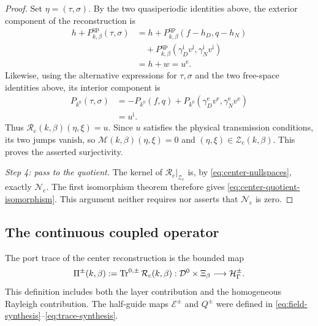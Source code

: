 \begin{proof}
Set $\eta=(\tau,\sigma)$.  By the two quasiperiodic identities above, the
exterior component of the reconstruction is
\begin{align*}
  h+P^{\mathrm{qp}}_{k,\beta}(\tau,\sigma)
  &=h+P^{\mathrm{qp}}_{k,\beta}(f-h_D,q-h_N)\\
  &\quad
    +P^{\mathrm{qp}}_{k,\beta}
      (\gamma_D^{\mathrm i}v^{\mathrm i},
       \gamma_N^{\mathrm i}v^{\mathrm i})\\
  &=h+w=u^{\mathrm e}.
\end{align*}
Likewise, using the alternative expressions for $\tau,\sigma$ and the two
free-space identities above, its interior component is
\begin{align*}
  P_{k^0}(\tau,\sigma)
  &=-P_{k^0}(f,q)
    +P_{k^0}(\gamma_D^{\mathrm e}v^{\mathrm e},
             \gamma_N^{\mathrm e}v^{\mathrm e})\\
  &=u^{\mathrm i}.
\end{align*}
Thus $\mathcal R_{\mathrm c}(k,\beta)(\eta,\xi)=u$.  Since $u$ satisfies
the physical transmission conditions, its two jumps vanish, so
$\mathcal M(k,\beta)(\eta,\xi)=0$ and
$(\eta,\xi)\in\mathcal Z_{\mathrm c}(k,\beta)$.  This proves the asserted
surjectivity.

\emph{Step 4: pass to the quotient.}
The kernel of
$\mathcal R_{\mathrm c}|_{\mathcal Z_{\mathrm c}}$ is, by
\eqref{eq:center-nullspaces}, exactly $\mathcal N_{\mathrm c}$.  The first
isomorphism theorem therefore gives
\eqref{eq:center-quotient-isomorphism}.  This argument neither requires nor
asserts that $\mathcal N_{\mathrm c}$ is zero.
\end{proof}

\subsection{The continuous coupled operator}

The port trace of the center reconstruction is the bounded map
\begin{equation}
  \Pi^\pm(k,\beta):=\operatorname{Tr}^{0,\pm}\mathcal R_{\mathrm c}(k,\beta):
  \mathcal D^0\times\Xi_\beta\longrightarrow\mathcal H_\Gamma^\pm.
  \label{eq:center-port-map}
\end{equation}
This definition includes both the layer contribution and the homogeneous
Rayleigh contribution.  The half-guide maps $\mathcal E^\pm$ and $Q^\pm$ were
defined in \eqref{eq:field-synthesis}--\eqref{eq:trace-synthesis}.

